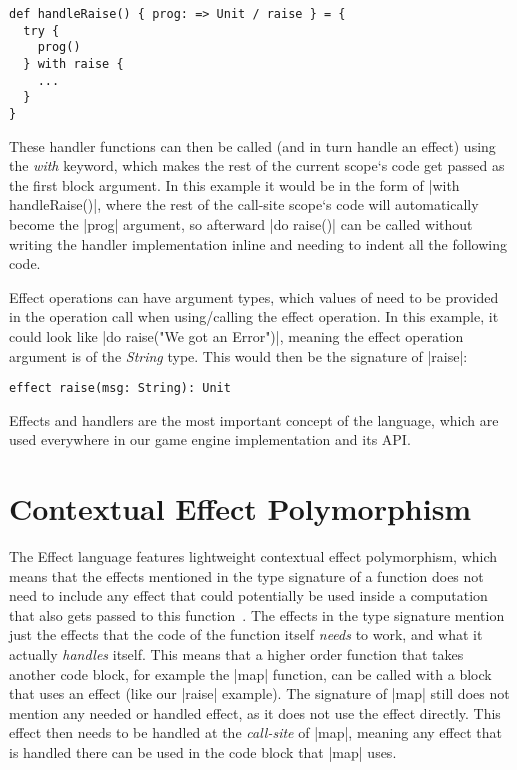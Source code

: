 \begin{lstlisting}
def handleRaise() { prog: => Unit / raise } = {
  try {
    prog()
  } with raise {
    ...
  }
}
\end{lstlisting}

These handler functions can then be called (and in turn handle an effect) using the \textit{with} keyword, which makes the rest of the current scope`s code get passed as the first block argument. In this example it would be in the form of |with handleRaise()|, where the rest of the call-site scope`s code will automatically become the |prog| argument, so afterward |do raise()| can be called without writing the handler implementation inline and needing to indent all the following code.

Effect operations can have argument types, which values of need to be provided in the operation call when using/calling the effect operation. In this example, it could look like |do raise("We got an Error")|, meaning the effect operation argument is of the \textit{String} type. This would then be the signature of |raise|:

\begin{lstlisting}
effect raise(msg: String): Unit
\end{lstlisting}

Effects and handlers are the most important concept of the language, which are used everywhere in our game engine implementation and its API.

\section{Contextual Effect Polymorphism}

The Effect language features lightweight contextual effect polymorphism, which means that the effects mentioned in the type signature of a function does not need to include any effect that could potentially be used inside a computation that also gets passed to this function~\cite{brachthauser2020effects}. The effects in the type signature mention just the effects that the code of the function itself \textit{needs} to work, and what it actually \textit{handles} itself. This means that a higher order function that takes another code block, for example the |map| function, can be called with a block that uses an effect (like our |raise| example). The signature of |map| still does not mention any needed or handled effect, as it does not use the effect directly. This effect then needs to be handled at the \textit{call-site} of |map|, meaning any effect that is handled there can be used in the code block that |map| uses.

